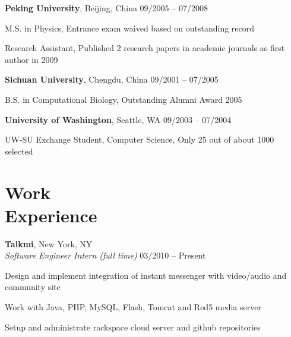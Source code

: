 \documentclass[margin,line]{resume}
\begin{document}
\begin{resume}
    \textbf{Peking University}, Beijing, China \hfill 09/2005 -- 07/2008 \vspace{-3mm}\\\vspace{-1mm}%
      \begin{list2}
       \item M.S. in Physics, Entrance exam waived based on outstanding record
       \item Research Assistant, Published 2 research papers in academic journals as first author in 2009
      \end{list2}
    
    \textbf{Sichuan University}, Chengdu, China \hfill 09/2001 -- 07/2005 \vspace{-3mm}\\\vspace{-1mm}%
      \begin{list2}
       \item B.S. in Computational Biology, Outstanding Alumni Award 2005
      \end{list2}

    \textbf{University of Washington}, Seattle, WA \hfill 09/2003 -- 07/2004 \vspace{-3mm}\\\vspace{-1mm}%
      \begin{list2}
       \item  UW-SU Exchange Student, Computer Science, Only 25 out of about 1000 selected
      \end{list2}
      

    \section{\mysidestyle Work \\ Experience}

    \textbf{Talkmi}, New York, NY \\
    \textsl{Software Engineer Intern (full time)} \hfill 03/2010 -- Present \vspace{-3mm}\\\vspace{-1mm}%
      \begin{list2}
      \item Design and implement integration of instant messenger with video/audio and community site
      \item Work with Java, PHP, MySQL, Flash, Tomcat and Red5 media server
      \item Setup and administrate rackspace cloud server and github repositories
      \end{list2}


\end{resume}
\end{document}
